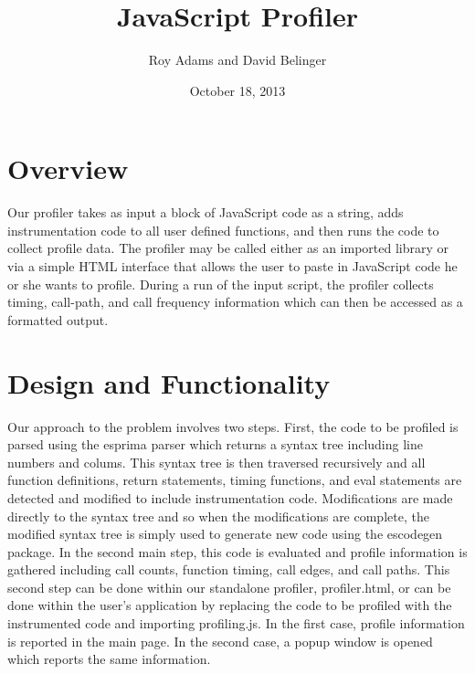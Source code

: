 \documentclass[11pt]{article}
\begin{document}
\newenvironment{myindentpar}[1]%
{\begin{list}{}%
         {\setlength{\leftmargin}{#1}}%
         \item[]%
}
{\end{list}}

\title{JavaScript Profiler}
\date{October 18, 2013}
\author{Roy Adams and David Belinger}

\maketitle

\section{Overview}

	Our profiler takes as input a block of JavaScript code as a string, adds instrumentation code 
to all user defined functions, and then runs the code to collect profile data. The profiler may 
be called either as an imported library or via a simple HTML interface that allows the user to 
paste in JavaScript code he or she wants to profile. During a run of the input script, the profiler 
collects timing, call-path, and call frequency information which can then be accessed as a formatted output. 

\section{Design and Functionality}
	
	Our approach to the problem involves two steps. First, the code to be profiled is parsed using the 
esprima parser which returns a syntax tree including line numbers and colums. This 
syntax tree is then traversed recursively and all function definitions, return statements, timing 
functions, and eval statements are detected and modified to include instrumentation code. Modifications 
are made directly to the syntax tree and so when the modifications are complete, the modified syntax 
tree is simply used to generate new code using the escodegen package. In the second 
main step, this code is evaluated and profile information is gathered including call counts, function 
timing, call edges, and call paths. This second step can be done within our standalone profiler, 
profiler.html, or can be done within the user's application by replacing the code to be profiled 
with the instrumented code and importing profiling.js. In the first case, profile information is 
reported in the main page. In the second case, a popup window is opened which reports the same information.
\end{document}
